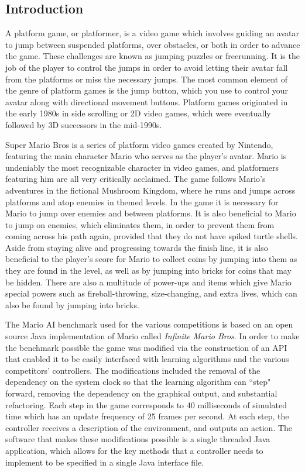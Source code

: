 \documentclass[12pt]{article}
\begin{document}
\setlength{\columnsep}{.65cm}
\begin{multicols}{2}
\section * {Introduction}
A platform game, or platformer, is a video game which involves guiding an avatar to jump between suspended 
platforms, over obstacles, or both in order to advance the game. These challenges are known as jumping puzzles 
or freerunning. It is the job of the player to control the jumps in order to avoid letting their avatar fall from the 
platforms or miss the necessary jumps. The most common element of the genre of platform games is the jump 
button, which you use to control your avatar along with directional movement buttons. Platform games originated in the early 1980s in side scrolling or 2D video games, which were eventually 
followed by 3D successors in the mid-1990s.

Super Mario Bros is a series of platform video games created by Nintendo, featuring the main character Mario who 
serves as the player's avatar. 
Mario is undeniably the most recognizable character in video games, and platformers featuring him 
are all very critically acclaimed.  
The game follows Mario's adventures in the fictional Mushroom Kingdom, where he 
runs and jumps across platforms and atop enemies in themed levels. In the game it is necessary for Mario to jump 
over enemies and between platforms. It is also beneficial to Mario to jump on enemies, which eliminates them, in order to prevent them 
from coming across his path again, provided that they do not have spiked turtle shells. Aside from staying alive and 
progressing towards the finish line, it is also beneficial to the player's score for Mario to collect coins by jumping 
into them as they are found in the level, as well as by jumping into bricks for coins that may be hidden. There are 
also a multitude of power-ups and items which give Mario special powers such as fireball-throwing, size-changing, 
and extra lives, which can also be found by jumping into bricks.

The Mario AI benchmark used for the various competitions is based on an open source 
Java implementation of Mario called \textit{Infinite Mario Bros}.  
In order to make the benchmark possible the game was modified via the construction of an API that enabled it to be 
easily interfaced with learning algorithms and the various competitors' controllers. The modifications included the 
removal of the dependency on the system clock so that the learning algorithm can ``step" forward, removing the 
dependency on the graphical output, and substantial refactoring. Each step in the game corresponds to 40 
milliseconds of simulated time which has an update frequency of 25 frames per second. At each step, the controller 
receives a description of the environment, and outputs an action. The software that makes these modifications 
possible is a single threaded Java application, which allows for the key methods that a controller needs to 
implement to be specified in a single Java interface file.


\end{multicols}
\end{document}
